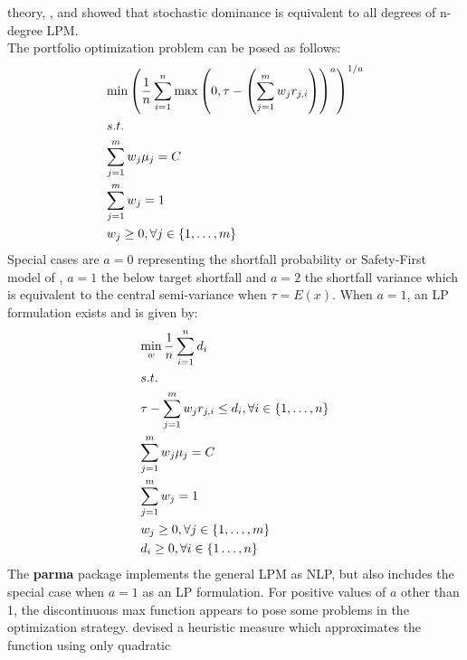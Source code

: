 theory, \citet{Bawa1977}, \citet{Bawa1978} and
\citet{Fishburn1977} showed that stochastic dominance is equivalent to
all degrees
of n-degree LPM.\\
The portfolio optimization problem can be posed as follows:
\begin{equation}
\begin{gathered}
 {\min {{\left( {\frac{1}{n}\sum\limits_{i=1}^n {\max {{\left( {0,\tau  - \left( {\sum\limits_{j=1}^m {{w_j}{r_{j,i}}} } \right)} \right)}^a}} } \right)}^{1/a}}}  \hfill \\
  s.t. \hfill\\
  \sum\limits_{j=1}^m {{w_j}{\mu _j}=C}  \hfill \\
  \sum\limits_{j=1}^m {{w_j}=1}  \hfill \\
  {w_j} \geq 0,\forall j \in \left\{ {1,\dots,m} \right\} \hfill \\
\end{gathered}
\end{equation}
Special cases are $a=0$ representing the shortfall probability or
Safety-First  model of \citet{Roy1952}, $a=1$ the below target shortfall
and $a=2$ the shortfall variance which is equivalent to the central
semi-variance when $\tau=E\left(x\right)$. When $a=1$, an LP formulation
exists and is given by:
\begin{equation}
\begin{gathered}
  \mathop {\min }\limits_w \frac{1}{n}\sum\limits_{i=1}^n {{d_i}}  \hfill \\
  s.t. \hfill \\
  \tau  - \sum\limits_{j=1}^m {{w_j}{r_{j,i}}}  \leq {d_i},\forall i \in \left\{ {1,\dots,n} \right\} \hfill \\
  \sum\limits_{j=1}^m {{w_j}{\mu _j}=C}  \hfill \\
  \sum\limits_{j=1}^m {{w_j}=1}  \hfill \\
  {w_j} \geq 0,\forall j \in \left\{ {1,\dots,m} \right\} \hfill \\
  {d_i} \geq 0,\forall i \in \left\{ {1\dots,n} \right\} \hfill \\
\end{gathered}
\end{equation}
The \textbf{parma} package implements the general LPM as NLP, but also
includes  the  special case when $a=1$ as an LP formulation. For positive
values of $a$ other than 1, the discontinuous max function appears to pose
some problems in the optimization strategy. \citet{Nawrocki1989} devised
a heuristic measure which approximates the function using only quadratic
